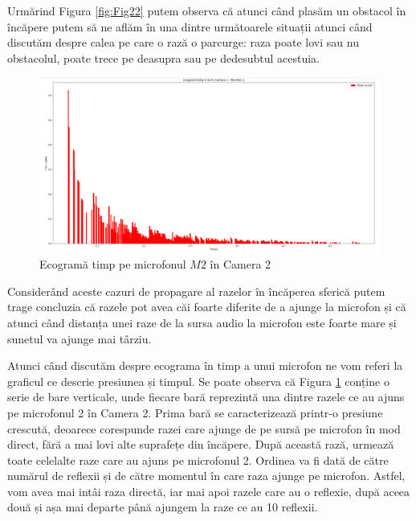 	Urmărind Figura \ref{fig:Fig22} putem observa că atunci când plasăm un obstacol în încăpere putem să ne aflăm în una dintre următoarele situații atunci când discutăm despre calea pe care o rază o parcurge: raza poate lovi sau nu obstacolul, poate trece pe deasupra sau pe dedesubtul acestuia.
	
	\begin{figure}[!htb]
		\centering
		\includegraphics[width=1\linewidth]{imagini/ecograma.png}
		\caption{Ecogramă timp pe microfonul $M2$ în Camera 2}
		\label{Fig23}
	\end{figure}
	
	Considerând aceste cazuri de propagare al razelor în încăperea sferică putem trage concluzia că razele pot avea căi foarte diferite de a ajunge la microfon și că atunci când distanța unei raze de la sursa audio la microfon este foarte mare și sunetul va ajunge mai târziu.
	
	Atunci când discutăm despre ecograma în timp a unui microfon ne vom referi la graficul ce descrie presiunea și timpul. Se poate observa că Figura \ref{Fig23} conține o serie de bare verticale, unde fiecare bară reprezintă una dintre razele ce au ajuns pe microfonul 2 în Camera 2. Prima bară se caracterizează printr-o presiune crescută, deoarece corespunde razei care ajunge de pe sursă pe microfon în mod direct, fără a mai lovi alte suprafețe din încăpere. După această rază, urmează toate celelalte raze care au ajuns pe microfonul 2. Ordinea va fi dată de către numărul de reflexii și de către momentul în care raza ajunge pe microfon. Astfel, vom avea mai intâi raza directă, iar mai apoi razele care au o reflexie, după aceea două și așa mai departe până ajungem la raze ce au 10 reflexii.

